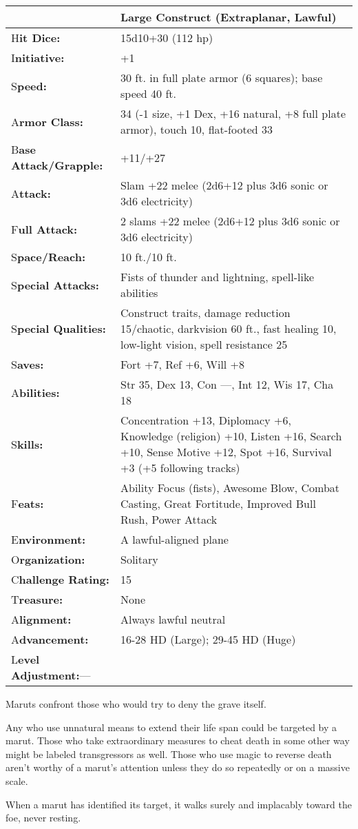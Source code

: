 \documentclass{article}
\begin{document}
\begin{tabular}{|>{\raggedright}p{75pt}|>{\raggedright}p{251pt}|}
\hline
  & Large Construct (Extraplanar, Lawful)\tabularnewline
\hline
H\textbf{it Dice:} & 15d10+30 (112 hp)\tabularnewline
\hline
I\textbf{nitiative:} & +1\tabularnewline
\hline
S\textbf{peed:} & 30 ft. in full plate armor (6 squares); base speed 40 ft.\tabularnewline
\hline
A\textbf{rmor Class:} & 34 (-1 size, +1 Dex, +16 natural, +8 full plate armor), 
touch 10, flat-footed 33\tabularnewline
\hline
B\textbf{ase Attack/Grapple:} & +11/+27\tabularnewline
\hline
A\textbf{ttack:} & Slam +22 melee (2d6+12 plus 3d6 sonic or 3d6 electricity)\tabularnewline
\hline
F\textbf{ull Attack:} & 2 slams +22 melee (2d6+12 plus 3d6 sonic or 3d6 electricity)\tabularnewline
\hline
S\textbf{pace/Reach:} & 10 ft./10 ft.\tabularnewline
\hline
S\textbf{pecial Attacks:} & Fists of thunder and lightning, spell-like abilities\tabularnewline
\hline
S\textbf{pecial Qualities:} & Construct traits, damage reduction 15/chaotic, darkvision 
60 ft., fast healing 10, low-light vision, spell resistance 25\tabularnewline
\hline
S\textbf{aves:} & Fort +7, Ref +6, Will +8\tabularnewline
\hline
A\textbf{bilities:} & Str 35, Dex 13, Con ---, Int 12, Wis 17, Cha 18\tabularnewline
\hline
S\textbf{kills:} & Concentration +13, Diplomacy +6, Knowledge (religion) +10, Listen 
+16, Search +10, Sense Motive +12, Spot +16, Survival +3 (+5 following tracks)\tabularnewline
\hline
F\textbf{eats:} & Ability Focus (fists), Awesome Blow, Combat Casting, Great Fortitude, 
Improved Bull Rush, Power Attack\tabularnewline
\hline
E\textbf{nvironment:} & A lawful-aligned plane\tabularnewline
\hline
O\textbf{rganization:} & Solitary\tabularnewline
\hline
C\textbf{hallenge Rating:} & 15\tabularnewline
\hline
T\textbf{reasure:} & None\tabularnewline
\hline
A\textbf{lignment:} & Always lawful neutral\tabularnewline
\hline
A\textbf{dvancement:} & 16-28 HD (Large); 29-45 HD (Huge)\tabularnewline
\hline
L\textbf{evel Adjustment:}--- & \tabularnewline
\hline
\end{tabular}

Maruts confront those who would try to deny the grave itself.

Any who use unnatural means to extend their life span could be targeted by a marut. 
Those who take extraordinary measures to cheat death in some other way might be 
labeled transgressors as well. Those who use magic to reverse death aren't worthy 
of a marut's attention unless they do so repeatedly or on a massive scale.

When a marut has identified its target, it walks surely and implacably toward the 
foe, never resting.
\end{document}
